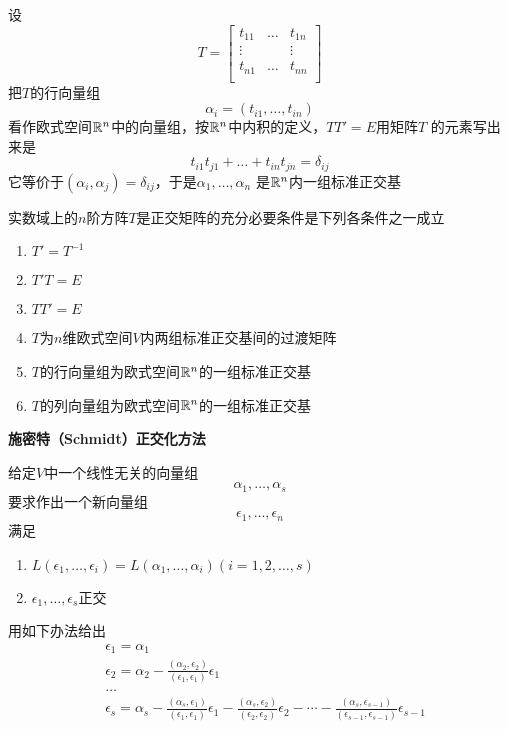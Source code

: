 \documentclass[11pt]{article}
\begin{document}
设
\begin{equation*}
T=
\begin{bmatrix}
t_{11}&\dots&t_{1n}\\
\vdots&&\vdots\\
t_{n1}&\dots&t_{nn}\\
\end{bmatrix}
\end{equation*}
把\(T\)的行向量组
\begin{equation*}
\alpha_i=(t_{i1},\dots,t_{in})
\end{equation*}
看作欧式空间\(\mathbb{R}^n\)中的向量组，按\(\mathbb{R}^n\)中内积的定义，\(TT'=E\)用矩阵\(T\)
的元素写出来是
\begin{equation*}
t_{i1}t_{j1}+\dots+t_{in}t_{jn}=\delta_{ij}
\end{equation*}
它等价于\((\alpha_i,\alpha_j)=\delta_{ij}\)，于是\(\alpha_1,\dots,\alpha_n\)
是\(\mathbb{R}^n\)内一组标准正交基

\begin{proposition}[]
实数域上的\(n\)阶方阵\(T\)是正交矩阵的充分必要条件是下列各条件之一成立
\begin{enumerate}
\item \(T'=T^{-1}\)
\item \(T'T=E\)
\item \(TT'=E\)
\item \(T\)为\(n\)维欧式空间\(V\)内两组标准正交基间的过渡矩阵
\item \(T\)的行向量组为欧式空间\(\mathbb{R}^n\)的一组标准正交基
\item \(T\)的列向量组为欧式空间\(\mathbb{R}^n\)的一组标准正交基
\end{enumerate}
\end{proposition}

\textbf{施密特（Schmidt）正交化方法}

给定\(V\)中一个线性无关的向量组
\begin{equation*}
\alpha_1,\dots,\alpha_s
\end{equation*}
要求作出一个新向量组
\begin{equation*}
\epsilon_1,\dots,\epsilon_n
\end{equation*}
满足
\begin{enumerate}
\item \(L(\epsilon_1,\dots,\epsilon_i)=L(\alpha_1,\dots,\alpha_i)(i=1,2,\dots,s)\)
\item \(\epsilon_1,\dots,\epsilon_s\)正交
\end{enumerate}


用如下办法给出
\begin{align*}
&\epsilon_1=\alpha_1\\
&\epsilon_2=\alpha_2-\frac{(\alpha_2,\epsilon_2)}{(\epsilon_1,\epsilon_1)}\epsilon_1\\
&\dots\\
&\epsilon_s=\alpha_s-\frac{(\alpha_s,\epsilon_1)}{(\epsilon_1,\epsilon_1)}\epsilon_1-
\frac{(\alpha_s,\epsilon_2)}{(\epsilon_2,\epsilon_2)}\epsilon_2-\cdots-
\frac{(\alpha_s,\epsilon_{s-1})}{(\epsilon_{s-1},\epsilon_{s-1})}\epsilon_{s-1}
\end{align*}
\end{document}

